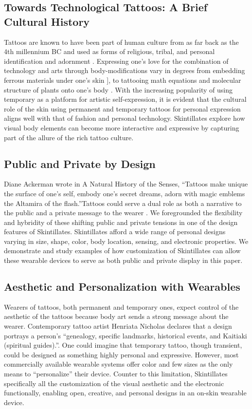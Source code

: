 \documentclass{sigchi}
\begin{document}
\subsection{Towards Technological Tattoos: A Brief Cultural History}

Tattoos are known to have been part of human culture from as far back as the 4th millennium BC and used as forms of religious,  tribal, and personal  identification  and adornment \cite{Grognard:o1z3U5M2}. Expressing  one’s  love  for the combination of technology and arts through body-modifications vary in degrees from  embedding  ferrous  materials  under one’s skin \cite{Norton:OK5Z52w0}], to tattooing math equations and molecular structure of plants onto one’s body \cite{Zimmer:2011wb}. With the increasing popularity of using temporary as a platform for artistic self-expression\cite{Fanning:v_9LfC8A,ByCourtneyRubin:tj}, it is evident that the cultural role of the skin using permanent and temporary tattoos for personal expression aligns well with that of fashion and personal technology.  Skintillates explore how visual body elements can become more interactive and expressive by capturing part of the allure of the rich tattoo culture. 

\subsection{Public and Private by Design}
Diane Ackerman wrote in A Natural History of the Senses, ``Tattoos make unique the surface of one's self, embody one's secret dreams, adorn with magic emblems the Altamira of the flash.''\cite{Mifflin:2013ux}Tattoos could serve a dual role as both a narrative to the public and a private message to the wearer \cite{Doss:2009ee,McLeod:2014ua}. We foregrounded the flexibility and hybridity of these shifting public and private tensions in one of the design features of Skintillates. Skintillates afford a wide range of personal designs varying in size, shape, color, body location, sensing, and electronic properties. We demonstrate and study examples of how customization of Skintillates can allow these wearable devices to serve as both public and private display in this paper. 

\subsection{Aesthetic and Personalization with Wearables}
Wearers of tattoos, both permanent and temporary ones, expect control of the aesthetic of the tattoos because body art sends a strong message about the wearer\cite{Doss:2009ee,McLeod:2014ua}. Contemporary tattoo artist Henriata Nicholas declares that a design portrays a person’s ``genealogy, specific landmarks, historical events, and Kaitiaki (spiritual guides).''\cite{Arp:2012ws}. One could imagine that temporary tattoo, though transient, could be designed as something highly personal and expressive. However, most commercially available wearable systems offer color and few sizes as the only means to “personalize” their device. Counter to this limitation, Skintillates specifically all the customization of the visual aesthetic and the electronic functionally, enabling open, creative, and personal designs in an on-skin wearable device. 
\end{document}
